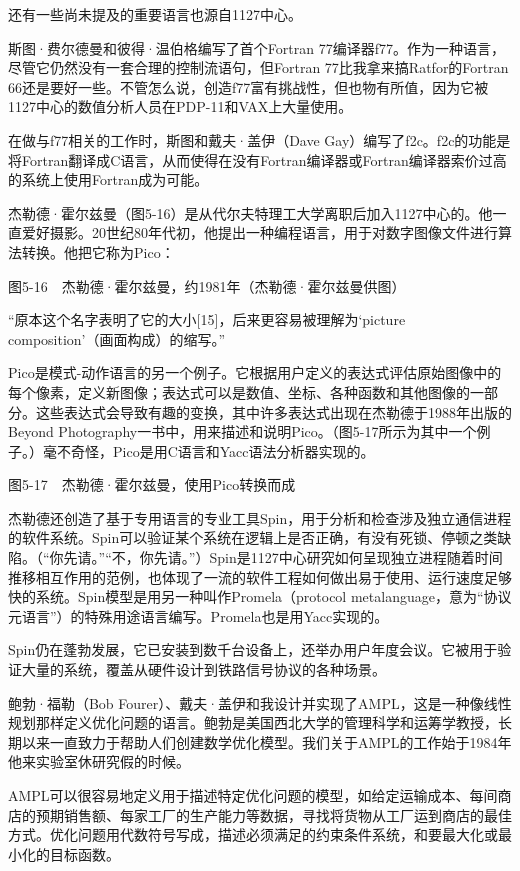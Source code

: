 \documentclass[a4paper,12pt,UTF8,twoside]{ctexbook}
\begin{document}
{{还有一些尚未提及的重要语言也源自1127中心。

斯图·费尔德曼和彼得·温伯格编写了首个Fortran 77编译器f77。作为一种语言，尽管它仍然没有一套合理的控制流语句，但Fortran 77比我拿来搞Ratfor的Fortran 66还是要好一些。不管怎么说，创造f77富有挑战性，但也物有所值，因为它被1127中心的数值分析人员在PDP-11和VAX上大量使用。

在做与f77相关的工作时，斯图和戴夫·盖伊（Dave Gay）编写了f2c。f2c的功能是将Fortran翻译成C语言，从而使得在没有Fortran编译器或Fortran编译器索价过高的系统上使用Fortran成为可能。

杰勒德·霍尔兹曼（图5-16）是从代尔夫特理工大学离职后加入1127中心的。他一直爱好摄影。20世纪80年代初，他提出一种编程语言，用于对数字图像文件进行算法转换。他把它称为Pico：



图5-16　杰勒德·霍尔兹曼，约1981年（杰勒德·霍尔兹曼供图）

“原本这个名字表明了它的大小[15]，后来更容易被理解为‘picture composition’（画面构成）的缩写。”



Pico是模式-动作语言的另一个例子。它根据用户定义的表达式评估原始图像中的每个像素，定义新图像；表达式可以是数值、坐标、各种函数和其他图像的一部分。这些表达式会导致有趣的变换，其中许多表达式出现在杰勒德于1988年出版的Beyond Photography一书中，用来描述和说明Pico。（图5-17所示为其中一个例子。）毫不奇怪，Pico是用C语言和Yacc语法分析器实现的。



图5-17　杰勒德·霍尔兹曼，使用Pico转换而成

杰勒德还创造了基于专用语言的专业工具Spin，用于分析和检查涉及独立通信进程的软件系统。Spin可以验证某个系统在逻辑上是否正确，有没有死锁、停顿之类缺陷。（“你先请。”“不，你先请。”）Spin是1127中心研究如何呈现独立进程随着时间推移相互作用的范例，也体现了一流的软件工程如何做出易于使用、运行速度足够快的系统。Spin模型是用另一种叫作Promela（protocol metalanguage，意为“协议元语言”）的特殊用途语言编写。Promela也是用Yacc实现的。

Spin仍在蓬勃发展，它已安装到数千台设备上，还举办用户年度会议。它被用于验证大量的系统，覆盖从硬件设计到铁路信号协议的各种场景。

鲍勃·福勒（Bob Fourer）、戴夫·盖伊和我设计并实现了AMPL，这是一种像线性规划那样定义优化问题的语言。鲍勃是美国西北大学的管理科学和运筹学教授，长期以来一直致力于帮助人们创建数学优化模型。我们关于AMPL的工作始于1984年他来实验室休研究假的时候。

AMPL可以很容易地定义用于描述特定优化问题的模型，如给定运输成本、每间商店的预期销售额、每家工厂的生产能力等数据，寻找将货物从工厂运到商店的最佳方式。优化问题用代数符号写成，描述必须满足的约束条件系统，和要最大化或最小化的目标函数。

}}
\end{document}

